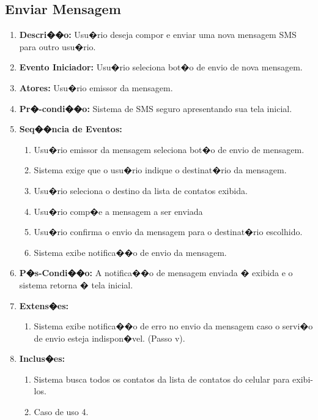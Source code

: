 \documentclass[a4paper,capchap,espacoduplo,normaltoc]{abntepusp}
\begin{document}
\subsection{Enviar Mensagem}
  	\begin{enumerate}
  	\item \textbf{Descri��o:} Usu�rio deseja compor e enviar uma nova mensagem SMS para outro usu�rio.
  	\item \textbf{Evento Iniciador:} Usu�rio seleciona bot�o de envio de nova mensagem.
  	\item \textbf{Atores:} Usu�rio emissor da mensagem.
  	\item \textbf{Pr�-condi��o:} Sistema de SMS seguro apresentando sua tela inicial.
  	\item \textbf{Seq��ncia de Eventos:} 
  	\begin{enumerate}
  	\item Usu�rio emissor da mensagem seleciona bot�o de envio de mensagem. 
		\item Sistema exige que o usu�rio indique o destinat�rio da mensagem.
		\item Usu�rio seleciona o destino da lista de contatos exibida.
		\item Usu�rio comp�e a mensagem a ser enviada
		\item	Usu�rio confirma o envio da mensagem para o destinat�rio escolhido.
		\item Sistema exibe notifica��o de envio da mensagem.
		\end{enumerate}
	  \item \textbf{P�s-Condi��o:} A notifica��o de mensagem enviada � exibida e o sistema retorna � tela inicial.
		\item \textbf{Extens�es:} 
		\begin{enumerate}
		\item Sistema exibe notifica��o de erro no envio da mensagem caso o servi�o de envio esteja indispon�vel. (Passo v).
		\end{enumerate}
		\item \textbf{Inclus�es:}
		\begin{enumerate}
		\item Sistema busca todos os contatos da lista de contatos do celular para exibi-los.
		\item	Caso de uso 4.
		\end{enumerate}
		\end{enumerate}
\end{document}
